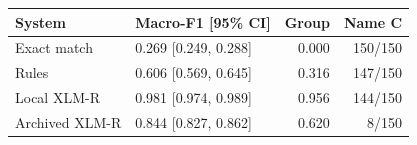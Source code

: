 \begin{tabular}{llrr}
\toprule
System & Macro-F1 [95\% CI] & Group & Name C \\
\midrule
Exact match & 0.269 [0.249, 0.288] & 0.000 & 150/150 \\
Rules & 0.606 [0.569, 0.645] & 0.316 & 147/150 \\
Local XLM-R & 0.981 [0.974, 0.989] & 0.956 & 144/150 \\
Archived XLM-R & 0.844 [0.827, 0.862] & 0.620 & 8/150 \\
\bottomrule
\end{tabular}
